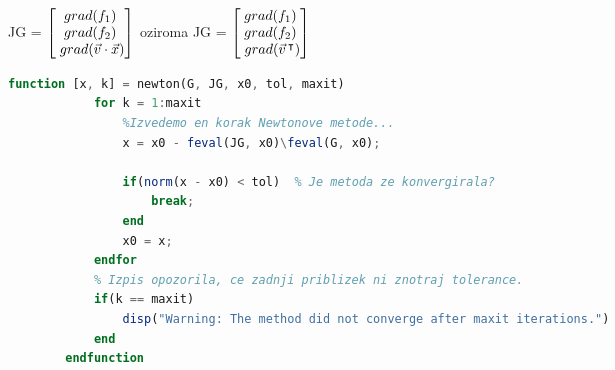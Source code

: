 \documentclass[]{article}
\begin{document}
	\begin{center}
		JG = $\begin{bmatrix}
		grad(f_{1}) \\
		grad(f_{2}) \\
		\hspace{1mm}grad(\vec{v} \cdot \vec{x}) \\
		\end{bmatrix}$
		oziroma
		JG = $\begin{bmatrix}
		grad(f_{1}) \\
		grad(f_{2}) \\
		\hspace{1mm}grad(\vec{v}\hspace{0.5mm}^\intercal) \\
		\end{bmatrix}$
	\end{center}
	\begin{lstlisting}[language=Octave]
		function [x, k] = newton(G, JG, x0, tol, maxit)
			for k = 1:maxit
				%Izvedemo en korak Newtonove metode...
				x = x0 - feval(JG, x0)\feval(G, x0);
				
				if(norm(x - x0) < tol)	% Je metoda ze konvergirala?
					break;
				end
				x0 = x;
			endfor
			% Izpis opozorila, ce zadnji priblizek ni znotraj tolerance.
			if(k == maxit)
				disp("Warning: The method did not converge after maxit iterations.")
			end
		endfunction
	\end{lstlisting} \ \\


		
\end{document}
